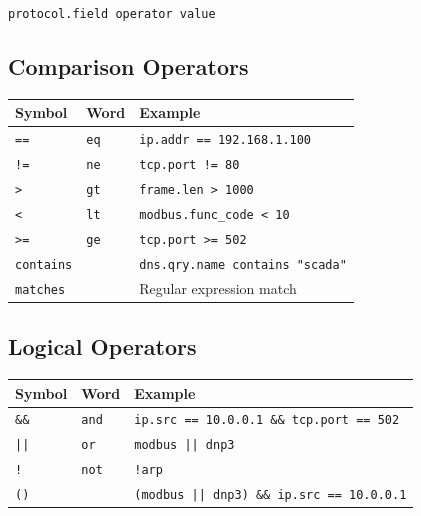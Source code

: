 \documentclass[12pt,twoside,openright]{memoir}
\newcommand{\filter}[1]{\texttt{\color{wsblue}#1}}
\begin{document}
\begin{center}
\texttt{\color{wsblue}protocol.field \color{wsnavy}operator \color{wsorange}value}
\end{center}

\subsection{Comparison Operators}
\begin{center}
\begin{tabular}{C{2cm}C{2cm}L{6cm}}
\toprule
{}
\textbf{Symbol} & \textbf{Word} & \textbf{Example} \\
\midrule
\texttt{==} & \texttt{eq} & \filter{ip.addr == 192.168.1.100} \\
\texttt{!=} & \texttt{ne} & \filter{tcp.port != 80} \\
\texttt{>} & \texttt{gt} & \filter{frame.len > 1000} \\
\texttt{<} & \texttt{lt} & \filter{modbus.func\_code < 10} \\
\texttt{>=} & \texttt{ge} & \filter{tcp.port >= 502} \\
\texttt{contains} & & \filter{dns.qry.name contains "scada"} \\
\texttt{matches} & & Regular expression match \\
\bottomrule
\end{tabular}
\end{center}

\subsection{Logical Operators}
\begin{center}
\begin{tabular}{C{2cm}C{2cm}C{6cm}}
\toprule
{}
\textbf{Symbol} & \textbf{Word} & \textbf{Example} \\
\midrule
\texttt{\&\&} & \texttt{and} & \filter{ip.src == 10.0.0.1 \&\& tcp.port == 502} \\
\texttt{||} & \texttt{or} & \filter{modbus || dnp3} \\
\texttt{!} & \texttt{not} & \filter{!arp} \\
\texttt{()} & & \filter{(modbus || dnp3) \&\& ip.src == 10.0.0.1} \\
\bottomrule
\end{tabular}
\end{center}
\end{document}
